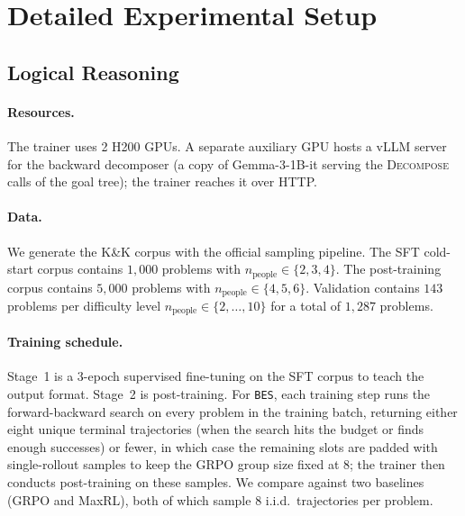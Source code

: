 \documentclass{llmxive}
\providecommand{\ours}{\texttt{BES}}
\begin{document}
\section{Detailed Experimental Setup}
\label{app:setup}

\subsection{Logical Reasoning}
\label{app:logical_setup}

\paragraph{Resources.}
The trainer uses 2 H200 GPUs. A separate auxiliary GPU hosts a vLLM
server for the backward decomposer (a copy of Gemma-3-1B-it serving the
\textsc{Decompose} calls of the goal tree); the
trainer reaches it over HTTP.

\paragraph{Data.}
We generate the K\&K corpus with the official sampling pipeline. The SFT
cold-start corpus contains $1{,}000$ problems with $n_\mathrm{people}\in\{2,3,4\}$.
The post-training corpus contains $5{,}000$ problems with
$n_\mathrm{people}\in\{4,5,6\}$.
Validation contains $143$ problems per difficulty level
$n_\mathrm{people}\in\{2,\dots,10\}$ for a total of $1{,}287$ problems.

\paragraph{Training schedule.}
Stage~1 is a 3-epoch supervised fine-tuning on the SFT corpus to teach the
output format. Stage~2 is post-training. For \ours, each training step runs the forward-backward
search on every problem in the training batch, returning either eight
unique terminal trajectories (when the search hits the budget or finds
enough successes) or fewer, in which case the remaining slots are padded
with single-rollout samples to keep the GRPO group size fixed at $8$;
the trainer then conducts post-training on these samples. We compare against two baselines (GRPO and MaxRL),
both of which sample $8$ i.i.d.\ trajectories per problem.
\end{document}
